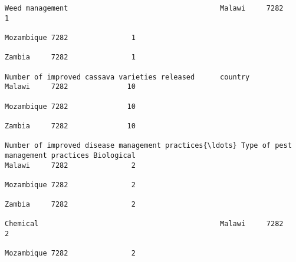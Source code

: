 \documentclass[11pt]{article}
\begin{document}
\begin{Verbatim}[commandchars=\\\{\}]
                                                                                                                                                              Weed management                                    Malawi     7282               1  
                                                                                                                                                                                                                 Mozambique 7282               1  
                                                                                                                                                                                                                 Zambia     7282               1  
                                                                         Number of improved cassava varieties released      country                                                                              Malawi     7282              10  
                                                                                                                                                                                                                 Mozambique 7282              10  
                                                                                                                                                                                                                 Zambia     7282              10  
                                                                         Number of improved disease management practices{\ldots} Type of pest management practices Biological                                         Malawi     7282               2  
                                                                                                                                                                                                                 Mozambique 7282               2  
                                                                                                                                                                                                                 Zambia     7282               2  
                                                                                                                                                              Chemical                                           Malawi     7282               2  
                                                                                                                                                                                                                 Mozambique 7282               2  

\end{Verbatim}
\end{document}
